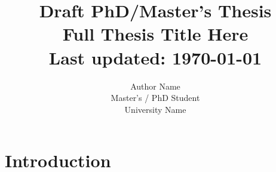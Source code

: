 \documentclass[b5paper,11pt,twoside,hidelinks]{book}
\begin{document}
%

\frontmatter

\author{Author Name \\ Master's / PhD Student \\ University Name}
\title{%
    Draft PhD/Master's Thesis \\
    \textbf{Full Thesis Title Here} \\
    \small Last updated: \today
}
\maketitle

%

%

\tableofcontents

\mainmatter
{}

\chapter{Introduction}\label{chapter:Intro}

\end{document}
